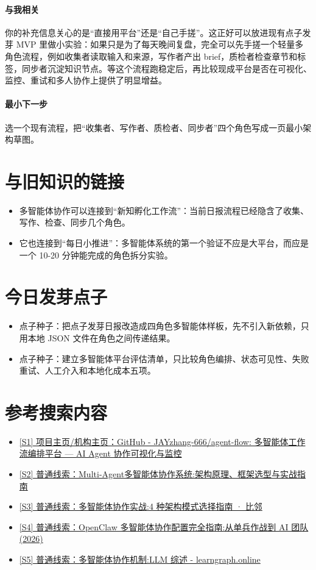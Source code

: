 \documentclass[UTF8,zihao=-4]{ctexart}
\begin{document}
\paragraph{与我相关} 你的补充信息关心的是“直接用平台”还是“自己手搓”。这正好可以放进现有点子发芽 MVP 里做小实验：如果只是为了每天晚间复盘，完全可以先手搓一个轻量多角色流程，例如收集者读取输入和来源，写作者产出 brief，质检者检查章节和标签，同步者沉淀知识节点。等这个流程跑稳定后，再比较现成平台是否在可视化、监控、重试和多人协作上提供了明显增益。
\paragraph{最小下一步} 选一个现有流程，把“收集者、写作者、质检者、同步者”四个角色写成一页最小架构草图。
\section*{与旧知识的链接}
\begin{itemize}[leftmargin=2em]
\item 多智能体协作可以连接到“新知孵化工作流”：当前日报流程已经隐含了收集、写作、检查、同步几个角色。
\item 它也连接到“每日小推进”：多智能体系统的第一个验证不应是大平台，而应是一个 10-20 分钟能完成的角色拆分实验。
\end{itemize}
\section*{今日发芽点子}
\begin{itemize}[leftmargin=2em]
\item 点子种子：把点子发芽日报改造成四角色多智能体样板，先不引入新依赖，只用本地 JSON 文件在角色之间传递结果。
\item 点子种子：建立多智能体平台评估清单，只比较角色编排、状态可见性、失败重试、人工介入和本地化成本五项。
\end{itemize}
\section*{参考搜索内容}
\begin{itemize}[leftmargin=2em]
\item \href{https://github.com/JAYzhang-666/agent-flow}{[S1] 项目主页/机构主页：GitHub - JAYzhang-666/agent-flow: 多智能体工作流编排平台 — AI Agent 协作可视化与监控}
\item \href{https://cloud.tencent.com/developer/article/2649756}{[S2] 普通线索：Multi-Agent多智能体协作系统:架构原理、框架选型与实战指南}
\item \href{https://eastondev.com/blog/zh/posts/ai/20260325-multi-agent-system/}{[S3] 普通线索：多智能体协作实战:4 种架构模式选择指南 · 比邻}
\item \href{https://ofox.ai/zh/blog/openclaw-multi-agent-collaboration-guide-2026/}{[S4] 普通线索：OpenClaw 多智能体协作配置完全指南:从单兵作战到 AI 团队(2026)}
\item \href{https://www.learngraph.online/ai-papers/module-5-compete-cooperation/5.7-Multi-Agent-Collaboration-Mechanisms.html}{[S5] 普通线索：多智能体协作机制:LLM 综述 - learngraph.online}
\end{itemize}
\end{document}
